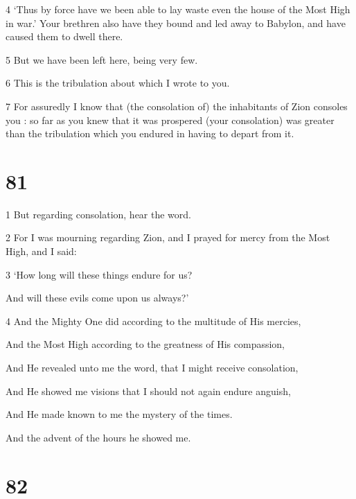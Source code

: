 \par 4 ‘Thus by force have we been able to lay waste even the house of the Most High in war.’ Your brethren also have they bound and led away to Babylon, and have caused them to dwell there. 

\par 5 But we have been left here, being very few. 

\par 6 This is the tribulation about which I wrote to you. 

\par 7 For assuredly I know that (the consolation of) the inhabitants of Zion consoles you : so far as you knew that it was prospered (your consolation) was greater than the tribulation which you endured in having to depart from it.

\chapter{81}

\par 1 But regarding consolation, hear the word. 

\par 2 For I was mourning regarding Zion, and I prayed for mercy from the Most High, and I said:

\par 3 ‘How long will these things endure for us?

\par And will these evils come upon us always?’

\par 4 And the Mighty One did according to the multitude of His mercies,

\par And the Most High according to the greatness of His compassion,

\par And He revealed unto me the word, that I might receive consolation,

\par And He showed me visions that I should not again endure anguish,

\par And He made known to me the mystery of the times.

\par And the advent of the hours he showed me.

\chapter{82}

